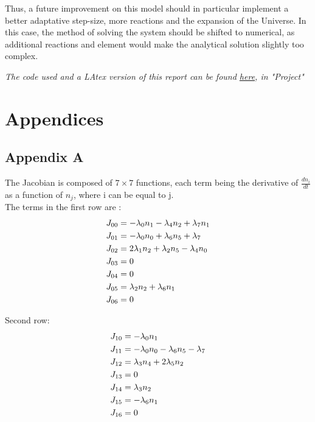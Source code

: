 \documentclass[a4paper, 12pt]{article}
\begin{document}
Thus, a future improvement on this model should in particular implement a better adaptative step-size, more reactions and the expansion of the Universe. In this case, the method of solving the system should be shifted to numerical, as additional reactions and element would make the analytical solution slightly too complex.

\vspace{1cm}


\emph{The code used and a LAtex version of this report can be found \href{https://github.com/AlbanSMA/CompAstroProject2/tree/edit3}{here}, in "Project"}

\printbibliography

\pagebreak
\section{Appendices}
\label{sec:app}

\subsection{Appendix A}
\label{subsec:appA}

The Jacobian is composed of $7 \times 7$ functions, each term being the derivative of $\frac{dn_i}{dt}$ as a function of $n_j$, where i can be equal to j.\\

The terms in the first row are :
\begin{equation*}
    \centering
    \begin{split}
        J_{00} &= -\lambda_0n_1 -\lambda_4n_2 +\lambda_7n_1\\
        J_{01} &= -\lambda_0n_0 +\lambda_6n_5 + \lambda_7\\
        J_{02} &= 2\lambda_1n_2 +\lambda_2n_5 - \lambda_4n_0\\
        J_{03} &= 0\\
        J_{04} &= 0\\
        J_{05} &= \lambda_2n_2 + \lambda_6n_1\\
        J_{06} &= 0\\
    \end{split}
\end{equation*}

Second row:
\begin{equation*}
    \centering
    \begin{split}
        J_{10} &= -\lambda_0n_1\\
        J_{11} &= -\lambda_0n_0 - \lambda_6n_5 - \lambda_7\\
        J_{12} &= \lambda_3n_4 + 2\lambda_5n_2\\
        J_{13} &= 0\\
        J_{14} &= \lambda_3n_2\\
        J_{15} &= -\lambda_6n_1\\
        J_{16} &= 0
    \end{split}
\end{equation*}
\end{document}
